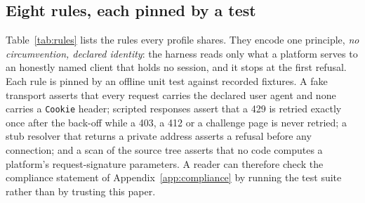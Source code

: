\documentclass[11pt]{article}
\begin{document}
\subsection{Eight rules, each pinned by a test}\label{sec:rules}
Table~\ref{tab:rules} lists the rules every profile shares. They encode one principle, \emph{no
circumvention, declared identity}: the harness reads only what a platform serves to an honestly named client
that holds no session, and it stops at the first refusal. Each rule is pinned by an offline unit test against
recorded fixtures. A fake transport asserts that every request carries the declared user agent and none
carries a \texttt{Cookie} header; scripted responses assert that a 429 is retried exactly once after the
back-off while a 403, a 412 or a challenge page is never retried; a stub resolver that returns a private
address asserts a refusal before any connection; and a scan of the source tree asserts that no code computes
a platform's request-signature parameters. A reader can therefore check the compliance statement of
Appendix~\ref{app:compliance} by running the test suite rather than by trusting this paper.
\end{document}
